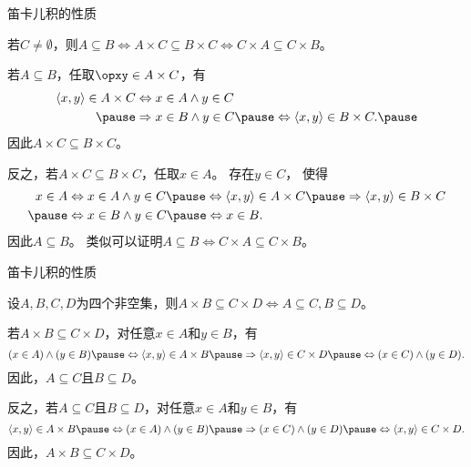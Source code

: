 \begin{frame}{笛卡儿积的性质}
\pause
\begin{thm}
  若$C\neq \emptyset$，则$A \subseteq B \Leftrightarrow A \times C \subseteq B \times C \Leftrightarrow C \times A \subseteq C \times B$。
\end{thm}
\pause
若$A\subseteq B$，\pause 任取$\opxy \in A\times C$，\pause 有
\begin{equation*}\begin{aligned}
\langle x, y\rangle \in A \times C & \Leftrightarrow x \in A \wedge y \in C \\\pause
& \Rightarrow x \in B \wedge y \in C \pause \Leftrightarrow\langle x, y\rangle \in B \times C.\pause
\end{aligned}\end{equation*}
因此$ A \times C \subseteq B \times C$。

\pause
反之，若$ A \times C \subseteq B \times C$，\pause 任取$x\in A$。 \pause 存在$y\in C$， 使得
\begin{equation*}\begin{aligned}
x \in A & \Leftrightarrow x \in A \wedge y \in C \pause \Leftrightarrow\langle x, y\rangle \in A \times C \pause \Rightarrow\langle x, y\rangle \in B \times C \\ \pause
&\Leftrightarrow x \in B \wedge y \in C\pause
\Leftrightarrow x \in B.
\end{aligned}\end{equation*}\pause
因此$A\subseteq B$。 \pause 类似可以证明$A \subseteq B \Leftrightarrow C \times A \subseteq C \times B$。
\end{frame}


\begin{frame}{笛卡儿积的性质}
\pause
\begin{thm}
  设$A,B,C,D$为四个非空集，则$A \times B \subseteq C \times D \Leftrightarrow A \subseteq C, B \subseteq D$。
\end{thm}\pause
\vspace{1ex}

若$A \times B \subseteq C \times D$，\pause 对任意$x\in A$和$y\in B$，\pause 有
\begin{equation*}
(x \in A) \wedge(y \in B) \pause \Leftrightarrow\langle x, y\rangle \in A \times B \pause
\Rightarrow\langle x, y\rangle \in C \times D \pause
 \Leftrightarrow(x \in C) \wedge(y \in D).
\end{equation*}\pause
因此，$A\subseteq C$且$B\subseteq D$。\pause

反之，若$A\subseteq C$且$B\subseteq D$，\pause 对任意$x\in A$和$y\in B$，\pause 有
\begin{equation*}
\langle x, y\rangle \in A \times B \pause \Leftrightarrow(x \in A) \wedge(y \in B)\pause
 \Rightarrow(x \in C) \wedge(y \in D) \pause
 \Leftrightarrow\langle x, y\rangle \in C \times D.
\end{equation*}\pause
因此，$A \times B \subseteq C \times D$。
\end{frame}

